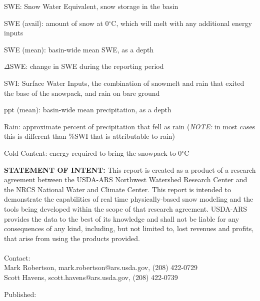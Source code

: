 \documentclass[11pt, oneside]{article}   	%
\begin{document}
\begin{itemize}
	\setlength\itemsep{0.05em}
	\footnotesize{
		\item[] SWE: Snow Water Equivalent, snow storage in the basin
		\item[] SWE (avail): amount of snow at 0$^{\circ}$C, which will melt with any additional energy inputs
		\item[] SWE (mean): basin-wide mean SWE, as a depth
		\item[] $\Delta$SWE: change in SWE during the reporting period
		\item[] SWI: Surface Water Inputs, the combination of snowmelt and rain that exited the base of the snowpack, and rain on bare ground
		\item[] ppt (mean): basin-wide mean precipitation, as a depth
		\item[] Rain: approximate percent of precipitation that fell as rain (\textit{NOTE:} in most cases this is different than \%SWI that is attributable to rain)
		\item[] Cold Content: energy required to bring the snowpack to 0$^{\circ}$C
	}
\end{itemize}

\vspace{1cm}

\noindent\textbf{STATEMENT OF INTENT:} This report is created as a product of a research agreement between the USDA-ARS Northwest Watershed Research Center and the NRCS National Water and Climate Center. This report is intended to demonstrate the capabilities of real time physically-based snow modeling and the tools being developed within the scope of that research agreement. USDA-ARS provides the data to the best of its knowledge and shall not be liable for any consequences of any kind, including, but not limited to, lost revenues and profits, that arise from using the products provided. \\
\vspace{1cm}  \\
\noindent
Contact: \\
\hspace{2cm} Mark Robertson, mark.robertson@ars.usda.gov, (208) 422-0729 \\
\hspace{2cm} Scott Havens, scott.havens@ars.usda.gov, (208) 422-0739 \\

\par\vspace*{\fill}
\noindent
\footnotesize{
Published: 
}
\end{document}
